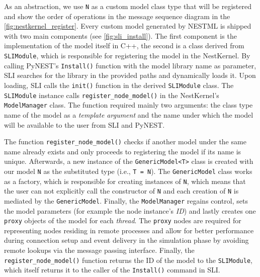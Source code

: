 As an abstraction, we use \texttt{N} as a custom model class type that will be registered and show the order of operations in the message sequence diagram in the \autoref{fig:nestkernel_register}. Every custom model generated by NESTML is shipped with two main components (see \autoref{fig:sli_install}). The first component is the implementation of the model itself in C++, the second is a class derived from \texttt{SLIModule}, which is responsible for registering the model in the NestKernel. By calling PyNEST's \texttt{Install()} function with the model library name as parameter, SLI searches for the library in the provided paths and dynamically loads it. Upon loading, SLI calls the \texttt{init()} function in the derived \texttt{SLIModule} class. The \texttt{SLIModule} instance calls \texttt{register\_node\_model()} in the NestKernel's \texttt{ModelManager} class. The function required mainly two arguments: the class type name of the model as a \emph{template argument} and the name under which the model will be available to the user from SLI and PyNEST.

The function \texttt{register\_node\_model()} checks if another model under the same name already exists and only proceeds to registering the model if its name is unique. Afterwards, a new instance of the \texttt{GenericModel<T>} class is created with our model \texttt{N} as the substituted type (i.e., \texttt{T = N}). The \texttt{GenericModel} class works as a factory, which is responsible for creating instances of \texttt{N}, which means that the user can not explicitly call the constructor of \texttt{N} and each creation of \texttt{N} is mediated by the \texttt{GenericModel}. Finally, the \texttt{ModelManager} regains control, sets the model parameters (for example the node instance's \emph{ID}) and lastly creates one \texttt{proxy} objects of the model for each \emph{thread}. The \texttt{proxy} nodes are required for representing nodes residing in remote processes and allow for better performance during connection setup and event delivery in the simulation phase by avoiding remote lookups via the message passing interface. Finally, the \texttt{register\_node\_model()} function returns the ID of the model to the \texttt{SLIModule}, which itself returns it to the caller of the \texttt{Install()} command in SLI.


